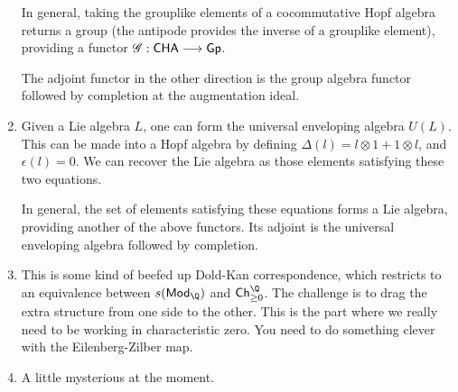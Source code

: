 \documentclass[11pt]{article}
\begin{document}
\begin{JeremyRationalHomotopyPractice}
\begin{enumerate}
In general, taking the grouplike elements of a cocommutative Hopf algebra returns a group (the antipode provides the inverse of a grouplike element), providing a functor $\mathscr{G}:\mathsf{CHA}\longrightarrow\mathsf{Gp}$.

\INDENT The adjoint functor in the other direction is the group algebra functor followed by completion at the augmentation ideal.
\item Given a Lie algebra $L$, one can form the universal enveloping algebra $U(L)$. This can be made into a Hopf algebra by defining $\Delta(l)=l\otimes1+1\otimes l$, and $\epsilon(l)=0$. We can recover the Lie algebra as those elements satisfying these two equations.

\INDENT In general, the set of elements satisfying these equations forms a Lie algebra, providing another of the above functors. Its adjoint is the universal enveloping algebra followed by completion.
\item This is some kind of beefed up Dold-Kan correspondence, which restricts to an equivalence between $s(\mathsf{Mod}_\Q)$ and $\mathsf{Ch}^{\Q}_{\geq0}$. The challenge is to drag the extra structure from one side to the other. This is the part where we really need to be working in characteristic zero. You need to do something clever with the Eilenberg-Zilber map.
\item A little mysterious at the moment.
\end{enumerate}














\pagebreak
\end{JeremyRationalHomotopyPractice}
\end{document}
